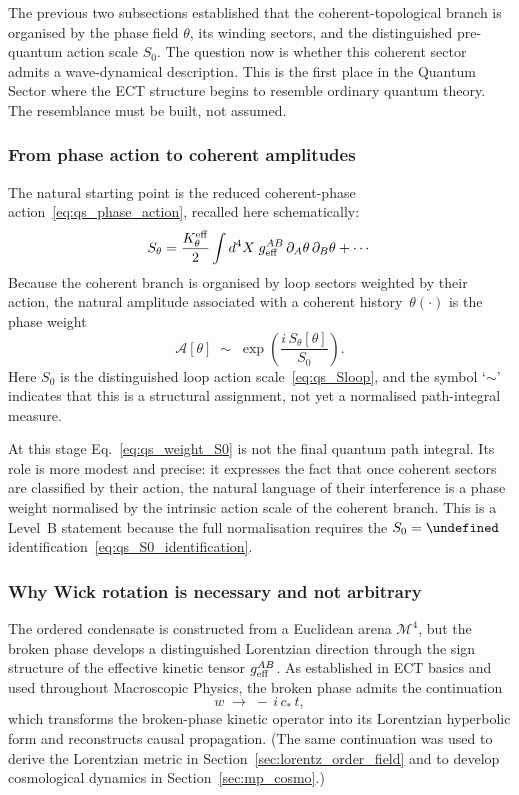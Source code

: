 \documentclass[11pt,a4paper]{article}
\let\hbar\undefined
\numberwithin{equation}{section}
\begin{document}
\medskip
The previous two subsections established that the coherent-topological
branch is organised by the phase field $\theta$, its winding sectors,
and the distinguished pre-quantum action scale $S_0$.
The question now is whether this coherent sector admits a
wave-dynamical description.
This is the first place in the Quantum Sector where the ECT structure
begins to resemble ordinary quantum theory.
The resemblance must be built, not assumed.

\subsubsection*{From phase action to coherent amplitudes}

The natural starting point is the reduced coherent-phase
action~\eqref{eq:qs_phase_action}, recalled here schematically:
\[
  S_\theta
  = \frac{K_\theta^{\rm eff}}{2}
    \int d^4X\; g_{\rm eff}^{AB}\,\partial_A\theta\,\partial_B\theta
    + \cdots
\]
Because the coherent branch is organised by loop sectors weighted by
their action, the natural amplitude associated with a coherent
history~$\theta(\cdot)$ is the phase weight
\begin{equation}
  \label{eq:qs_weight_S0}
  \mathcal{A}[\theta]
  \;\sim\;
  \exp\!\left(\frac{i\,S_\theta[\theta]}{S_0}\right).
\end{equation}
Here $S_0$ is the distinguished loop action scale~\eqref{eq:qs_Sloop},
and the symbol `$\sim$' indicates that this is a structural assignment,
not yet a normalised path-integral measure.

At this stage Eq.~\eqref{eq:qs_weight_S0} is not the final quantum
path integral.
Its role is more modest and precise: it expresses the fact that once
coherent sectors are classified by their action, the natural language
of their interference is a phase weight normalised by the intrinsic
action scale of the coherent branch.
This is a Level~B statement because the full normalisation requires the
$S_0=\hbar$ identification~\eqref{eq:qs_S0_identification}.

\subsubsection*{Why Wick rotation is necessary and not arbitrary}

The ordered condensate is constructed from a Euclidean arena
$\mathcal{M}^4$, but the broken phase develops a distinguished
Lorentzian direction through the sign structure of the effective kinetic
tensor $g_{\rm eff}^{AB}$.
As established in ECT basics and used throughout Macroscopic Physics,
the broken phase admits the continuation
\begin{equation}
  \label{eq:qs_wick}
  w \;\to\; -\,i\,c_*\,t,
\end{equation}
which transforms the broken-phase kinetic operator into its Lorentzian
hyperbolic form and reconstructs causal propagation.
(The same continuation was used to derive the Lorentzian metric
in Section~\ref{sec:lorentz_order_field} and to develop
cosmological dynamics in Section~\ref{sec:mp_cosmo}.)
\end{document}
